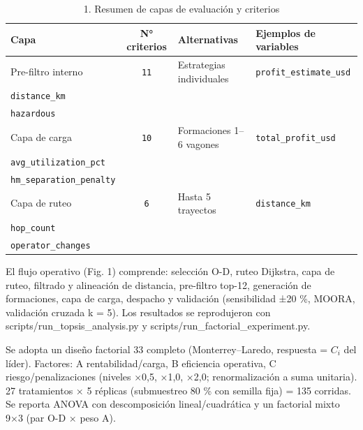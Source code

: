 \documentclass[runningheads]{llncs}
\begin{document}
\begin{table}[t]
\centering
\caption{1. Resumen de capas de evaluación y criterios}
\begin{tabular}{|l|c|p{3.6cm}|p{4.8cm}|}
\hline
\textbf{Capa} & \textbf{N° criterios} & \textbf{Alternativas} & \textbf{Ejemplos de variables} \\
\hline
Pre-filtro interno & \texttt{11} & Estrategias individuales & \texttt{profit\_estimate\_usd} \\ \texttt{distance\_km} \\ \texttt{hazardous} \\
\hline
Capa de carga & \texttt{10} & Formaciones 1–6 vagones & \texttt{total\_profit\_usd} \\ \texttt{avg\_utilization\_pct} \\ \texttt{hm\_separation\_penalty} \\
\hline
Capa de ruteo & \texttt{6} & Hasta 5 trayectos & \texttt{distance\_km} \\ \texttt{hop\_count} \\ \texttt{operator\_changes} \\
\hline
\end{tabular}
\end{table}
El flujo operativo (Fig. 1) comprende: selección O-D, ruteo Dijkstra, capa de ruteo, filtrado y alineación de distancia, pre-filtro top-12, generación de formaciones, capa de carga, despacho y validación (sensibilidad ±20 \%, MOORA, validación cruzada k = 5). Los resultados se reprodujeron con scripts/run\_topsis\_analysis.py y scripts/run\_factorial\_experiment.py.

Se adopta un diseño factorial 33 completo (Monterrey–Laredo, respuesta = $C_i$ del líder). Factores: A rentabilidad/carga, B eficiencia operativa, C riesgo/penalizaciones (niveles ×0,5, ×1,0, ×2,0; renormalización a suma unitaria). 27 tratamientos × 5 réplicas (submuestreo 80 \% con semilla fija) = 135 corridas. Se reporta ANOVA con descomposición lineal/cuadrática y un factorial mixto 9×3 (par O-D × peso A).
\end{document}
